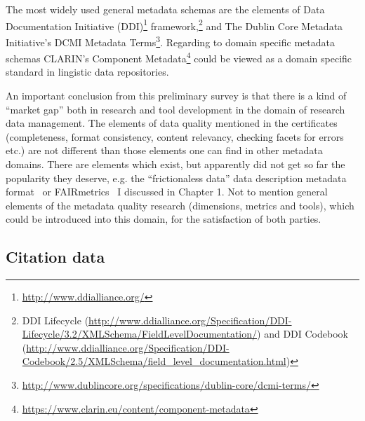 The most widely used general metadata schemas are the elements of Data Documentation Initiative (DDI)\footnote{\url{http://www.ddialliance.org/}} framework,\footnote{DDI Lifecycle (\url{http://www.ddialliance.org/Specification/DDI-Lifecycle/3.2/XMLSchema/FieldLevelDocumentation/}) and DDI Codebook (\url{http://www.ddialliance.org/Specification/DDI-Codebook/2.5/XMLSchema/field_level_documentation.html})} and The Dublin Core Metadata Initiative's DCMI Metadata Terms\footnote{\url{http://www.dublincore.org/specifications/dublin-core/dcmi-terms/}}. Regarding to domain specific metadata schemas CLARIN's Component Metadata\footnote{\url{https://www.clarin.eu/content/component-metadata}} could be viewed as a domain specific standard in lingistic data repositories.

An important conclusion from this preliminary survey is that there is a kind of ``market gap'' both in research and tool development in the domain of research data management. The elements of data quality mentioned in the certificates (completeness, format consistency, content relevancy, checking facets for errors etc.) are not different than those elements one can find in other metadata domains. There are elements which exist, but apparently did not get so far the popularity they deserve, e.g. the ``frictionaless data'' data description metadata format~\cite{fowler2018} or FAIRmetrics~\cite{fairmetrics} I discussed in Chapter 1. Not to mention general elements of the metadata quality research (dimensions, metrics and tools), which could be introduced into this domain, for the satisfaction of both parties.

\subsection{Citation data}

